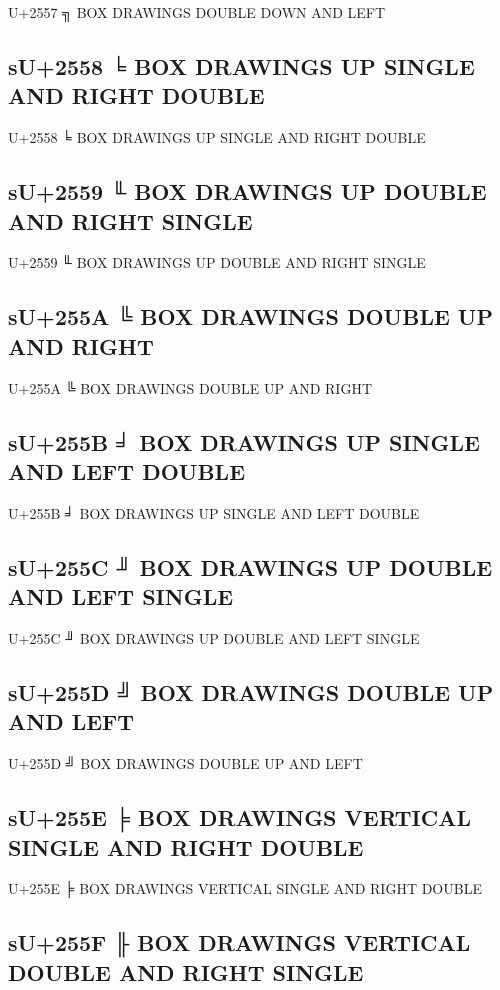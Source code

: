 U+2557 ╗ BOX DRAWINGS DOUBLE DOWN AND LEFT

\subsection{sU+2558 ╘ BOX DRAWINGS UP SINGLE AND RIGHT DOUBLE}

U+2558 ╘ BOX DRAWINGS UP SINGLE AND RIGHT DOUBLE

\subsection{sU+2559 ╙ BOX DRAWINGS UP DOUBLE AND RIGHT SINGLE}

U+2559 ╙ BOX DRAWINGS UP DOUBLE AND RIGHT SINGLE

\subsection{sU+255A ╚ BOX DRAWINGS DOUBLE UP AND RIGHT}

U+255A ╚ BOX DRAWINGS DOUBLE UP AND RIGHT

\subsection{sU+255B ╛ BOX DRAWINGS UP SINGLE AND LEFT DOUBLE}

U+255B ╛ BOX DRAWINGS UP SINGLE AND LEFT DOUBLE

\subsection{sU+255C ╜ BOX DRAWINGS UP DOUBLE AND LEFT SINGLE}

U+255C ╜ BOX DRAWINGS UP DOUBLE AND LEFT SINGLE

\subsection{sU+255D ╝ BOX DRAWINGS DOUBLE UP AND LEFT}

U+255D ╝ BOX DRAWINGS DOUBLE UP AND LEFT

\subsection{sU+255E ╞ BOX DRAWINGS VERTICAL SINGLE AND RIGHT DOUBLE}

U+255E ╞ BOX DRAWINGS VERTICAL SINGLE AND RIGHT DOUBLE

\subsection{sU+255F ╟ BOX DRAWINGS VERTICAL DOUBLE AND RIGHT SINGLE}

